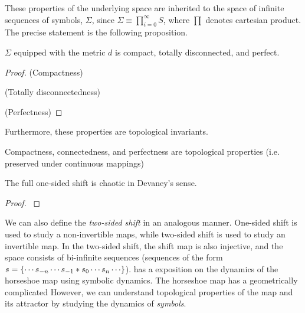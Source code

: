 \documentclass[12pt,twoside]{book}
\begin{document}
These properties of the underlying space are inherited to the space of infinite sequences of symbols, $\Sigma$, since $\Sigma \equiv \prod\limits_{i = 0}^{\infty} S$, where $\prod$ denotes cartesian product.
The precise statement is the following proposition.
\begin{proposition}
  $\Sigma$ equipped with the metric $d$ is compact, totally disconnected, and perfect.
  \begin{proof}
    (Compactness)

    (Totally disconnectedness)

    (Perfectness)

  \end{proof}
\end{proposition}
Furthermore, these properties are topological invariants.
\begin{proposition}
  Compactness, connectedness, and perfectness are topological properties (i.e. preserved under continuous mappings)
\end{proposition}

\begin{theorem}
  The full one-sided shift is chaotic in Devaney's sense.
  \begin{proof}
    \citep{sternberg}
  \end{proof}
\end{theorem}

We can also define the \textit{two-sided shift} in an analogous manner.
One-sided shift is used to study a non-invertible maps, while two-sided shift is used to study an invertible map.
In the two-sided shift, the shift map is also injective, and the space consists of bi-infinite sequences (sequences of the form $s = \set{ \cdots s_{-n} \cdots s_{-1} * s_0 \cdots s_n \cdots }$).
\citet{wiggins} has a exposition on the dynamics of the horseshoe map using symbolic dynamics.
The horseshoe map has a geometrically complicated 
However, we can understand topological properties of the map and its attractor by studying the dynamics of \textit{symbols}.
\end{document}
